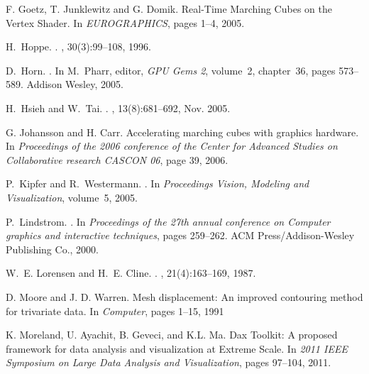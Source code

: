 \documentclass[10pt,journal,cspaper,compsoc]{IEEEtran}
\begin{document}
\begin{thebibliography}{10}
F. Goetz, T. Junklewitz and G. Domik.
\newblock Real-Time Marching Cubes on the Vertex Shader.
\newblock In {\em EUROGRAPHICS}, pages 1--4, 2005.

H.~Hoppe.
.
, 30(3):99--108, 1996.

D.~Horn.
.
\newblock In M.~Pharr, editor, {\em GPU Gems 2}, volume~2, chapter~36, pages
  573--589. Addison Wesley, 2005.

H.~Hsieh and W.~Tai.
.
, 13(8):681--692, Nov.
  2005.
  
G. Johansson and H. Carr.
\newblock Accelerating marching cubes with graphics hardware.
\newblock In {\em Proceedings of the 2006 conference of the Center for Advanced Studies on Collaborative research CASCON 06}, page 39, 2006.

P.~Kipfer and R.~Westermann.
.
\newblock In {\em Proceedings Vision, Modeling and Visualization}, volume~5,
  2005.

P.~Lindstrom.
.
\newblock In {\em Proceedings of the 27th annual conference on Computer
  graphics and interactive techniques}, pages 259--262. ACM
  Press/Addison-Wesley Publishing Co., 2000.

W.~E. Lorensen and H.~E. Cline.
.
, 21(4):163--169, 1987.

D. Moore and J. D. Warren.
\newblock Mesh displacement: An improved contouring method for trivariate data.
\newblock In {\em Computer}, pages 1--15, 1991

K. Moreland, U. Ayachit, B. Geveci, and K.L. Ma.
\newblock Dax Toolkit: A proposed framework for data analysis and visualization at Extreme Scale.
\newblock In {\em 2011 IEEE Symposium on Large Data Analysis and Visualization}, pages 97--104, 2011.


\end{thebibliography}
\end{document}
